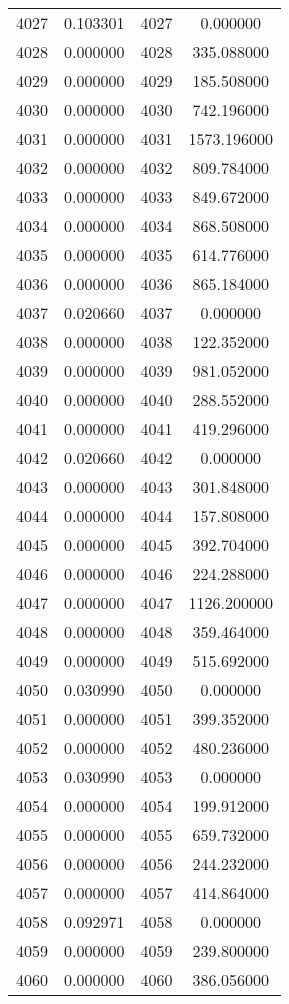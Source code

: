 \documentclass[12pt]{article}
\begin{document}
\begin{longtable}{@{}cccc@{}}
4027 & 0.103301 & 4027 & 0.000000 \\
4028 & 0.000000 & 4028 & 335.088000 \\
4029 & 0.000000 & 4029 & 185.508000 \\
4030 & 0.000000 & 4030 & 742.196000 \\
4031 & 0.000000 & 4031 & 1573.196000 \\
4032 & 0.000000 & 4032 & 809.784000 \\
4033 & 0.000000 & 4033 & 849.672000 \\
4034 & 0.000000 & 4034 & 868.508000 \\
4035 & 0.000000 & 4035 & 614.776000 \\
4036 & 0.000000 & 4036 & 865.184000 \\
4037 & 0.020660 & 4037 & 0.000000 \\
4038 & 0.000000 & 4038 & 122.352000 \\
4039 & 0.000000 & 4039 & 981.052000 \\
4040 & 0.000000 & 4040 & 288.552000 \\
4041 & 0.000000 & 4041 & 419.296000 \\
4042 & 0.020660 & 4042 & 0.000000 \\
4043 & 0.000000 & 4043 & 301.848000 \\
4044 & 0.000000 & 4044 & 157.808000 \\
4045 & 0.000000 & 4045 & 392.704000 \\
4046 & 0.000000 & 4046 & 224.288000 \\
4047 & 0.000000 & 4047 & 1126.200000 \\
4048 & 0.000000 & 4048 & 359.464000 \\
4049 & 0.000000 & 4049 & 515.692000 \\
4050 & 0.030990 & 4050 & 0.000000 \\
4051 & 0.000000 & 4051 & 399.352000 \\
4052 & 0.000000 & 4052 & 480.236000 \\
4053 & 0.030990 & 4053 & 0.000000 \\
4054 & 0.000000 & 4054 & 199.912000 \\
4055 & 0.000000 & 4055 & 659.732000 \\
4056 & 0.000000 & 4056 & 244.232000 \\
4057 & 0.000000 & 4057 & 414.864000 \\
4058 & 0.092971 & 4058 & 0.000000 \\
4059 & 0.000000 & 4059 & 239.800000 \\
4060 & 0.000000 & 4060 & 386.056000 \\

\end{longtable}
\end{document}
